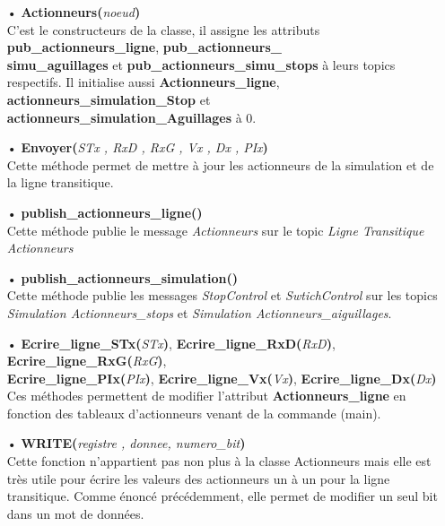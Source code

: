 \documentclass[a4paper,french, titlepage]{book}
\begin{document}
\begin{itemize}
\item[•] \textbf{Actionneurs(}\emph{noeud}\textbf{)}\\
C'est le constructeurs de la classe, il assigne les attributs \textbf{pub\_actionneurs\_ligne}, \textbf{pub\_actionneurs\_\\simu\_aguillages} et \textbf{pub\_actionneurs\_simu\_stops} à leurs topics respectifs. Il initialise aussi \textbf{Actionneurs\_ligne}, \textbf{actionneurs\_simulation\_Stop} et \textbf{actionneurs\_simulation\_Aguillages} à 0.
\item[ ] 
\item[•] \textbf{Envoyer(}\emph{STx , RxD , RxG , Vx , Dx , PIx}\textbf{)}\\
Cette méthode permet de mettre à jour les actionneurs de la simulation et de la ligne transitique.
\item[ ] 
\item[•] \textbf{publish\_actionneurs\_ligne()}\\
Cette méthode publie le message \emph{Actionneurs} sur le topic \emph{Ligne Transitique Actionneurs}
\item[ ] 
\item[•] \textbf{publish\_actionneurs\_simulation()}\\
Cette méthode publie les messages \emph{StopControl} et \emph{SwtichControl} sur les topics \emph{Simulation Actionneurs\_stops} et \emph{Simulation Actionneurs\_aiguillages}.
\item[ ] 
\item[•] \textbf{Ecrire\_ligne\_STx(}\emph{STx}\textbf{)}, \textbf{Ecrire\_ligne\_RxD(}\emph{RxD}\textbf{)}, \textbf{Ecrire\_ligne\_RxG(}\emph{RxG}\textbf{)},\\
\textbf{Ecrire\_ligne\_PIx(}\emph{PIx}\textbf{)}, \textbf{Ecrire\_ligne\_Vx(}\emph{Vx}\textbf{)}, \textbf{Ecrire\_ligne\_Dx(}\emph{Dx}\textbf{)}\\
Ces méthodes permettent de modifier l'attribut \textbf{Actionneurs\_ligne} en fonction des tableaux d'actionneurs venant de la commande (main).
\item[ ] 
\item[•]  \textbf{WRITE(}\emph{registre , donnee, numero\_bit}\textbf{)}\\
Cette fonction n'appartient pas non plus à la classe Actionneurs mais elle est très utile pour écrire les valeurs des actionneurs un à un pour la ligne transitique. Comme énoncé précédemment, elle permet de modifier un seul bit dans un mot de données.
\end{itemize}
\end{document}
